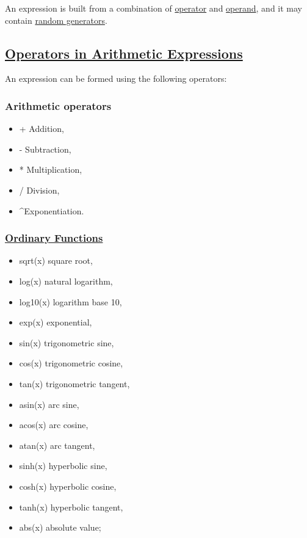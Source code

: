 An expression is built from a combination of
\hyperlink{operator}{operator} and \hyperlink{operand}{operand}, and it
may contain \hyperlink{random}{random generators}.   

\subsection{\href{operator}{Operators in Arithmetic Expressions}} 
\label{subsec:operator}
An expression can be formed using the following operators: 

\subsubsection{Arithmetic operators}
\begin{itemize}
	\item + Addition, 
	\item - Subtraction, 
	\item * Multiplication, 
	\item / Division, 
	\item \textasciicircum Exponentiation. 
\end{itemize}

\subsubsection{\href{function}{Ordinary Functions}}
\label{subsubsec:function}
\begin{itemize}
	\item sqrt(x) square root, 
	\item log(x) natural logarithm, 
	\item log10(x) logarithm base 10, 
	\item exp(x) exponential, 
	\item sin(x) trigonometric sine, 
	\item cos(x) trigonometric cosine, 
	\item tan(x) trigonometric tangent, 
	\item asin(x) arc sine, 
	\item acos(x) arc cosine, 
	\item atan(x) arc tangent, 
	\item sinh(x) hyperbolic sine, 
	\item cosh(x) hyperbolic cosine, 
	\item tanh(x) hyperbolic tangent, 
	\item abs(x) absolute value; 
\end{itemize}

